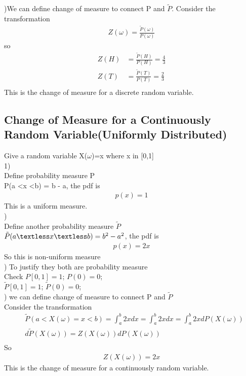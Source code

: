 \documentclass[a4paper]{article}
\begin{document}
)We can define change of measure to connect P and $\tilde P$. Consider the transformation 
\begin{align*}
	Z(\omega) = \frac{\tilde P(\omega)}{P(\omega)}
\end{align*}
so 
\begin{align*}
	Z(H) & = \frac{\tilde P(H)}{P(H)} = \frac{4}{3}\\
	Z(T) & = \frac{\tilde P(T)}{P(T)} = \frac{2}{3}\\
\end{align*}
This is the change of measure for a discrete random variable. \\
\subsection{Change of Measure for a Continuously Random Variable(Uniformly Distributed) } 
Give a random variable  X($\omega$)=x where x in [0,1]\\
1)\\
Define probability measure P \\
P(a \textless x \textless b) = b - a, the pdf is 
\begin{align*}
p(x) = 1	
\end{align*}
This is a uniform measure.\\

)\\
Define another probability measure $\tilde P$\\
$\tilde P(a \textless x  \textless b) = b^2 - a^2$, the pdf is 
\begin{align*}
p(x) = 2x
\end{align*}
So this is non-uniform measure\\


)	To justify they both are probability measure\\
Check  $P[0,1] = 1$; $P(0)=0$;\\
       $\tilde P[0,1] =1$; $\tilde P(0)=0$;\\


) we can define change of measure to connect P and $\tilde P$ \\
Consider the transformation \\
\begin{align*}
	&\tilde P(a < X(\omega) = x < b) = \int _a ^b 2x dx = \int _a ^b 2x dx = \int_a ^b 2x dP(X(\omega))\\
	&d\tilde P(X(\omega)) = Z(X(\omega)) dP(X(\omega)) \\
\end{align*}
So
\begin{align*}
	Z(X(\omega))= 2x
\end{align*}
This is the change of measure for a continuously random variable. \\
\end{document}
